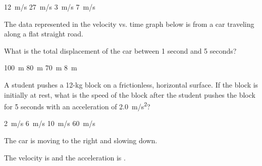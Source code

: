 \documentclass[../main-physics-problems.tex]{subfiles}
\begin{document}
\begin{questions}
\begin{randomizechoices}
    \choice \SI{12}{m/s}
    \correctchoice \SI{27}{m/s}
    \choice \SI{3}{m/s}
    \choice \SI{7}{m/s}
\end{randomizechoices}

\question
The data represented in the velocity vs. time graph below is from a car traveling along a flat straight road.

\begin{center}
\end{center}

What is the total displacement of the car between 1 second and 5 seconds?

\begin{randomizechoices}
    \choice \SI{100}{m}
    \correctchoice \SI{80}{m}
    \choice \SI{70}{m}
    \choice \SI{8}{m}
\end{randomizechoices}

\question
A student pushes a 12-kg block on a frictionless, horizontal surface. If the block is initially at rest, what is the speed of
the block after the student pushes the block for 5 seconds with an acceleration of \SI{2.0}{m/s^2}?

\begin{randomizechoices}
    \choice \SI{2}{m/s}
    \choice \SI{6}{m/s}
    \correctchoice \SI{10}{m/s}
    \choice \SI{60}{m/s}
\end{randomizechoices}

\question
The car is moving to the right and slowing down. 

\begin{center}
\end{center}

The velocity is \fillin[positive][4cm] and the acceleration is \fillin[negative][4cm].


\end{questions}
\end{document}
